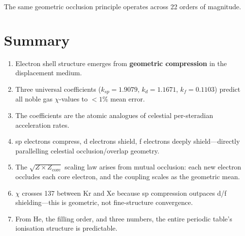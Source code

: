 The same geometric occlusion principle operates across 22 orders of magnitude.


\section{Summary}

\begin{enumerate}
  \item Electron shell structure emerges from \textbf{geometric compression} in the displacement medium.
  \item Three universal coefficients ($k_{sp} = 1.9079$, $k_d = 1.1671$, $k_f = 0.1103$) predict all noble gas $\chi$-values to $<1$\% mean error.
  \item The coefficients are the atomic analogues of celestial per-steradian acceleration rates.
  \item sp electrons compress, d electrons shield, f electrons deeply shield---directly parallelling celestial occlusion/overlap geometry.
  \item The $\sqrt{Z \times Z_{\text{core}}}$ scaling law arises from mutual occlusion: each new electron occludes each core electron, and the coupling scales as the geometric mean.
  \item $\chi$ crosses 137 between Kr and Xe because sp compression outpaces d/f shielding---this is geometric, not fine-structure convergence.
  \item From He, the filling order, and three numbers, the entire periodic table's ionisation structure is predictable.
\end{enumerate}


